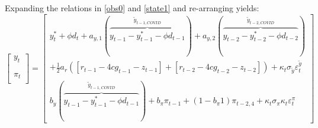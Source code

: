 \documentclass[a4paper,12pt]{article}
\begin{document}
\pagebreak

Expanding the relations in \ref{obs0} and \ref{state1} and re-arranging
yields:%
\begin{equation}
\begin{bmatrix}
y_{t} \\ 
\\ 
\\ 
\pi _{t} \\ 
\end{bmatrix}%
=%
\begin{bmatrix}
y_{t}^{\ast }+\phi d_{t}+a_{y,1}(\overbrace{y_{t-1}-y_{t-1}^{\ast }-\phi
d_{t-1}}^{\tilde{y}_{t-1,COVID}})+a_{y,2}(\overbrace{y_{t-2}-y_{t-2}^{\ast
}-\phi d_{t-2}}^{\tilde{y}_{t-2,COVID}}) \\ 
+\frac{1}{2}a_{r}\left( \left[ r_{t-1}-4cg_{t-1}-z_{t-1}\right] +\left[
r_{t-2}-4cg_{t-2}-z_{t-2}\right] \right) +\kappa _{t}\sigma _{\tilde{y}%
}\varepsilon _{t}^{\tilde{y}} \\ 
\\[-5mm]
b_{y}(\overbrace{y_{t-1}-y_{t-1}^{\ast }-\phi d_{t-1}}^{\tilde{y}%
_{t-1,COVID}})+b_{\pi }\pi _{t-1}+\left( 1-b_{\pi }1\right) \pi
_{t-2,4}+\kappa _{t}\sigma _{\pi }\kappa _{t}\varepsilon _{t}^{\pi }%
\end{bmatrix}
\label{lwa}
\end{equation}
\end{document}
